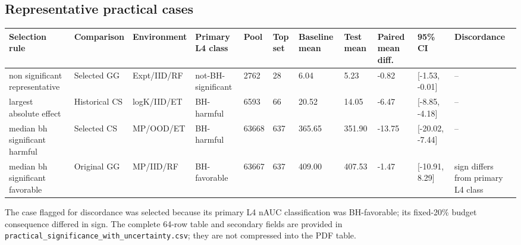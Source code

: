 \documentclass[9pt]{article}
\begin{document}
\begin{landscape}
\section*{Representative practical cases}
{\fontsize{8}{9.6}\selectfont
\begin{tabularx}{\linewidth}{YYYYYYYYYYY}
\toprule
Selection rule & Comparison & Environment & Primary L4 class & Pool & Top set & Baseline mean & Test mean & Paired mean diff. & 95\% CI & Discordance\\
\midrule
non significant representative & Selected GG & Expt/IID/RF & not-BH-significant & 2762 & 28 & 6.04 & 5.23 & -0.82 & [-1.53, -0.01] & --\\
largest absolute effect & Historical CS & logK/IID/ET & BH-harmful & 6593 & 66 & 20.52 & 14.05 & -6.47 & [-8.85, -4.18] & --\\
median bh significant harmful & Selected CS & MP/OOD/ET & BH-harmful & 63668 & 637 & 365.65 & 351.90 & -13.75 & [-20.02, -7.44] & --\\
median bh significant favorable & Original GG & MP/IID/RF & BH-favorable & 63667 & 637 & 409.00 & 407.53 & -1.47 & [-10.91, 8.29] & sign differs from primary L4 class\\
\bottomrule
\end{tabularx}}
\end{landscape}

The case flagged for discordance was selected because its primary L4 nAUC
classification was BH-favorable; its fixed-20\% budget consequence differed
in sign. The complete 64-row table and secondary fields are provided in
\texttt{practical\_significance\_with\_uncertainty.csv}; they are not compressed
into the PDF table.
\end{document}
